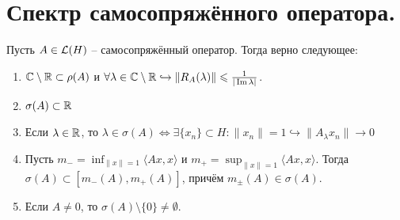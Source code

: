 \section{Спектр самосопряжённого оператора.}\label{seq:selfadjoint}
\begin{theorem}
    Пусть $A \in \mathcal{L}(H)$ -- самосопряжённый оператор.
    Тогда верно следующее:
    \begin{enumerate}
        \item $\mathbb{C} \setminus \mathbb{R} \subset \rho(A)$ и $\forall \lambda \in \mathbb{C} \setminus \mathbb{R} \hookrightarrow \|R_A(\lambda)\| \leqslant \frac{1}{|\operatorname{Im} \lambda|}$.
        \item $\sigma(A) \subset \mathbb{R}$
        \item Если $\lambda \in \mathbb{R}$, то $\lambda \in \sigma(A) \Longleftrightarrow \exists \{x_n\} \subset H\colon \|x_n\| = 1 \hookrightarrow \|A_\lambda x_n\| \rightarrow 0$
        \item Пусть $m_- = \inf_{\|x\| = 1}\langle Ax, x \rangle$ и $m_+ = \sup_{\|x\| = 1} \langle Ax ,x\rangle$. Тогда $\sigma(A) \subset [m_-(A), m_+(A)]$, причём $m_\pm(A) \in \sigma(A)$.
        \item Если $A \neq 0$, то $\sigma(A) \setminus \{0\} \neq \emptyset$.
    \end{enumerate}
\end{theorem}
